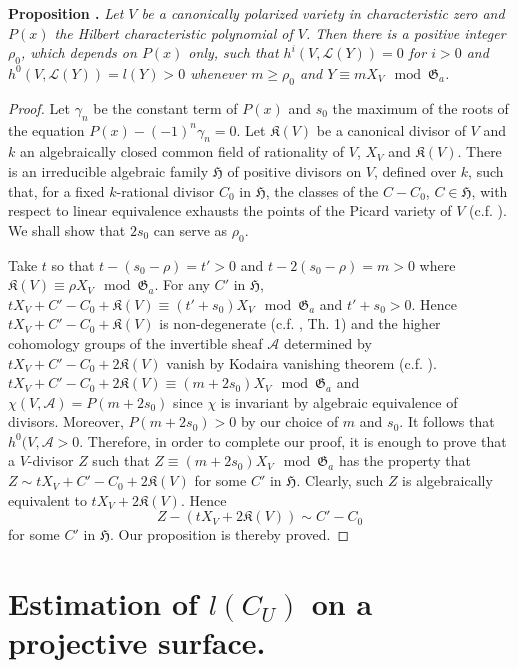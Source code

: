 \medskip
\noindent
{\bf Proposition .\label{art14-prop1}}
{\em Let $V$ be a canonically polarized variety in characteristic zero and $P(x)$ the Hilbert characteristic polynomial of $V$. Then there is a positive integer $\rho_{0}$, which depends on $P(x)$ only, such that $h^{i}(V,\mathscr{L}(Y))=0$ for $i>0$ and $h^{0}(V,\mathscr{L}(Y))=l(Y)>0$ whenever $m\geq \rho_{0}$ and $Y\equiv mX_{V}\mod \mathfrak{G}_{a}$.}

\begin{proof}
Let $\gamma_{n}$ be the constant term of $P(x)$ and $s_{0}$ the maximum of the roots of the equation $P(x)-(-1)^{n}\gamma_{n}=0$. Let $\mathfrak{K}(V)$ be a canonical divisor of $V$ and $k$ an algebraically closed common field of rationality of $V$, $X_{V}$ and $\mathfrak{K}(V)$. There is an irreducible algebraic family $\mathfrak{H}$ of positive divisors on $V$, defined over $k$, such that, for a fixed $k$-rational divisor $C_{0}$ in $\mathfrak{H}$, the classes of the $C-C_{0}$, $C\in \mathfrak{H}$, with respect to linear equivalence exhausts the points of the Picard variety of $V$ (c.f. \cite{art14-key15}). We shall show that $2s_{0}$ can serve as $\rho_{0}$.

Take $t$ so that $t-(s_{0}-\rho)=t'>0$ and $t-2(s_{0}-\rho)=m>0$ where $\mathfrak{K}(V)\equiv \rho X_{V}\mod \mathfrak{G}_{a}$. For any $C'$ in $\mathfrak{H}$, $tX_{V}+C'-C_{0}+\mathfrak{K}(V)\equiv (t'+s_{0})X_{V}\mod \mathfrak{G}_{a}$ and $t'+s_{0}>0$. Hence $tX_{V}+C'-C_{0}+\mathfrak{K}(V)$ is non-degenerate (c.f. \cite{art14-key16}, Th. 1) and the higher cohomology groups of the invertible sheaf $\mathscr{A}$ determined by $tX_{V}+C'-C_{0}+2\mathfrak{K}(V)$ vanish by Kodaira vanishing theorem (c.f. \cite{art14-key11}). $tX_{V}+C'-C_{0}+2\mathfrak{K}(V)\equiv (m+2s_{0})X_{V}\mod \mathfrak{G}_{a}$ and $\chi(V,\mathscr{A})=P(m+2s_{0})$ since $\chi$ is invariant by algebraic equivalence of divisors. Moreover, $P(m+2s_{0})>0$ by our choice of $m$ and $s_{0}$. It follows that $h^{0}(V,\mathscr{A}>0$. Therefore, in order to complete our proof, it is enough to prove that a $V$-divisor $Z$ such that $Z\equiv (m+2s_{0})X_{V}\mod \mathfrak{G}_{a}$ has the property that $Z\sim tX_{V}+C'-C_{0}+2\mathfrak{K}(V)$ for some $C'$ in $\mathfrak{H}$. Clearly, such $Z$ is algebraically equivalent to $tX_{V}+2\mathfrak{K}(V)$. Hence
$$
Z-(tX_{V}+2\mathfrak{K}(V))\sim C'-C_{0}
$$
for some $C'$ in $\mathfrak{H}$. Our proposition is thereby proved.
\end{proof}

\section{Estimation of \texorpdfstring{$l(C_{U})$}{CU} on a projective surface.}\label{art14-sec2}\pageoriginale

